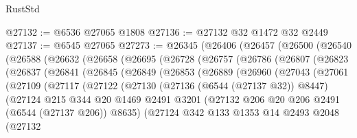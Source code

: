\begin{lexlean}{RustStd}
\begin{coremodule}
@27132 := @6536 @27065 @1808
@27136 := @27132 @32 @1472 @32 @2449
@27137 := @6545 @27065
@27273 := @26345
    (@26406
      (@26457
        (@26500
          (@26540
            (@26588
              (@26632
                (@26658
                  (@26695
                    (@26728
                      (@26757
                        (@26786
                          (@26807
                            (@26823
                              (@26837
                                (@26841
                                  (@26845
                                    (@26849
                                      (@26853
                                        (@26889
                                          (@26960
                                            (@27043
                                              (@27061
                                                (@27109
                                                  (@27117
                                                    (@27122
                                                      (@27130
                                                        (@27136 (@6544 (@27137 @32)) @8447)
                                                        (@27124
                                                          @215
                                                          @344
                                                          @20
                                                          @1469
                                                          @2491
                                                          @3201
                                                          (@27132
                                                            @206
                                                            @20
                                                            @206
                                                            @2491
                                                            (@6544 (@27137 @206))
                                                            @8635)
                                                          (@27124
                                                            @342
                                                            @133
                                                            @1353
                                                            @14
                                                            @2493
                                                            @2048
                                                            (@27132

\end{coremodule}
\end{lexlean}

